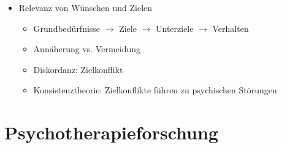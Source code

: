 \documentclass[11pt, paper=a4, twocolumn]{scrartcl}
\begin{document}
\begin{itemize}
			\item Relevanz von Wünschen und Zielen
				\begin{itemize}
					\item Grundbedürfnisse $\rightarrow$ Ziele $\rightarrow$ Unterziele $\rightarrow$ Verhalten
					\item Annäherung vs. Vermeidung
					\item Diskordanz: Zielkonflikt
					\item Konsistenztheorie: Zielkonflikte führen zu psychischen Störungen
				\end{itemize}
		\end{itemize}

	\section{Psychotherapieforschung}
\end{document}
